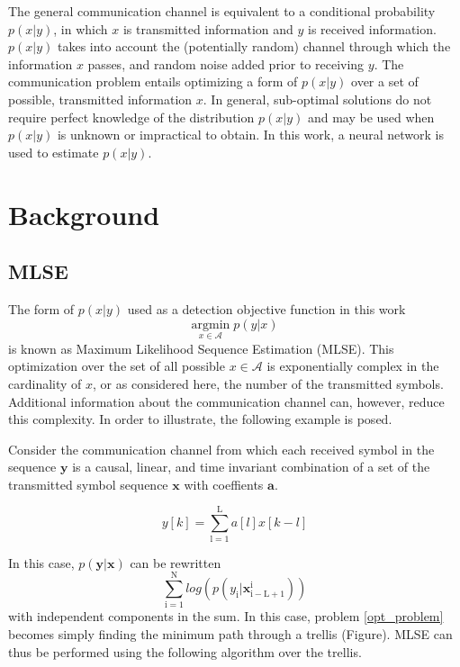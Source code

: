 \documentclass[12pt,a4paper]{report}
\begin{document}
The general communication channel is equivalent to a conditional probability $p(x|y)$, in which $x$ is transmitted information and $y$ is received information.  $p(x|y)$ takes into account the (potentially random) channel through which the information $x$ passes, and random noise added prior to receiving $y$. The communication problem entails optimizing a form of $p(x|y)$ over a set of possible, transmitted information $x$. In general, sub-optimal solutions do not require perfect knowledge of the distribution $p(x|y)$ and may be used when $p(x|y)$ is unknown or impractical to obtain. In this work, a neural network is used to estimate $p(x|y)$.

\section{Background}

\subsection{MLSE}
The form of $p(x|y)$ used as a detection objective function in this work 
\begin{equation}\label{opt_problem}
\underset{x \in \textit{$\mathcal{A}$}}{\text{argmin}} \; p(y|x)
\end{equation}
is known as Maximum Likelihood Sequence Estimation (MLSE).
This optimization over the set of all possible $x \in \mathcal{A}$ is exponentially complex in the cardinality of $x$, or as considered here, the number of the transmitted symbols. Additional information about the communication channel can, however, reduce this complexity. In order to illustrate, the following example is posed.
\par
Consider the communication channel from which each received symbol in the sequence $\mathbf{y}$ is a causal, linear, and time invariant combination of a set of the transmitted symbol sequence $\mathbf{x}$ with coeffients $\mathbf{a}$. 

\begin{equation}
y[k] = \sum_{\mathrm{l=1}}^{\mathrm{L}} a[l]x[k-l]
\end{equation}

In this case, $p(\mathbf{y}|\mathbf{x})$ can be rewritten 
\begin{equation}
\sum_{\mathrm{i=1}}^{\mathrm{N}}log(p(y_{\mathrm{i}}|\mathbf{x}_{\mathrm{i-L+1}}^{\mathrm{i}}) )
\end{equation}
with independent components in the sum. In this case, problem \eqref{opt_problem} becomes simply finding the minimum path through a trellis (Figure).
MLSE can thus be performed using the following algorithm over the trellis. 
\\
\end{document}

